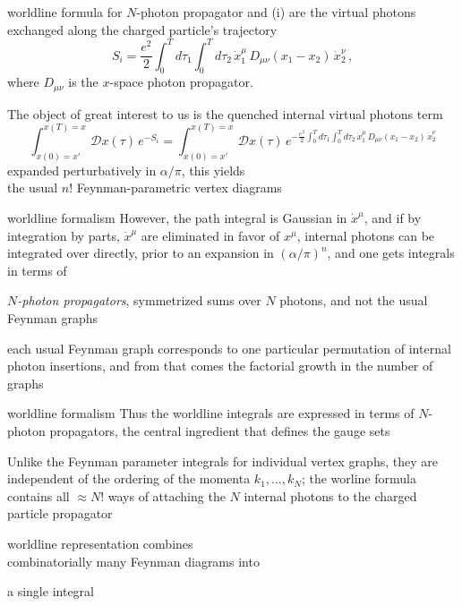 \begin{frame}{worldline formula for $N$-photon propagator}
and (i) are the virtual photons exchanged along the charged particle's
trajectory
\[ %
S_i = \frac{e^2}{2}\int_0^T\!\!d\tau_1\int_0^T\!\!d\tau_2\,
      \dot{x}_1^\mu\,D_{\mu\nu}(x_1-x_2)\,\dot{x}_2^\nu
\,,
\] %
where $D_{\mu\nu} $ is the $x$-space photon propagator.

\medskip
The object of great interest to us is the quenched internal virtual
photons term
\[ %
\int_{x(0)=x'}^{x(T)=x}\!\!\mathcal{D}x(\tau)\,
            {e}^{-S_i}
=
\int_{x(0)=x'}^{x(T)=x}\!\!\mathcal{D}x(\tau)\,
            {e}^{-\frac{e^2}{2}\int_0^T\!\!d\tau_1\int_0^T\!\!d\tau_2\,
      \dot{x}_1^\mu\,D_{\mu\nu}(x_1-x_2)\,\dot{x}_2^\nu}
\] %
expanded perturbatively in $\alpha/\pi$, this yields \\
the
usual $n!$ Feynman-parametric vertex diagrams
\end{frame}

\begin{frame}{worldline formalism}
However, the path integral is Gaussian in
$\dot{x}^\mu$, and if by integration by parts, $\dot{x}^\mu$ are
eliminated in favor of $x^\mu$, internal photons can be integrated over
directly, prior to an expansion in $(\alpha/\pi)^n$, and one gets
integrals in terms of

\bigskip
\emph{$N$-photon propagators}, symmetrized sums over $N$
photons, and not the usual
Feynman graphs

\bigskip
each usual Feynman graph corresponds to one particular
permutation of internal photon insertions, and from that comes the
factorial growth in the number of graphs
\end{frame}

\begin{frame}{worldline formalism}
Thus the worldline integrals are expressed
in terms of $N$-photon propagators, the central ingredient that defines
the gauge sets

\bigskip
Unlike the Feynman parameter integrals for individual vertex graphs, they are
independent of the ordering of the momenta $k_1,\ldots,k_N$; the worline formula
contains all $\approx N!$ ways of attaching the $N$ internal
photons to the charged particle propagator

\bigskip
worldline representation combines
\\
\textcolor{green!80!black}{combinatorially many} Feynman diagrams into

\medskip\hfill
a \textcolor{green!80!black}{{\Huge single}} integral

\end{frame}

